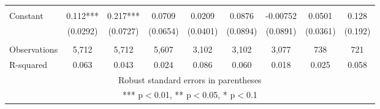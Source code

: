 \documentclass[]{article}
\begin{document}
\begin{tabular}{lcccccccc}
 &  &  &  &  &  &  &  &  \\
Constant & 0.112*** & 0.217*** & 0.0709 & 0.0209 & 0.0876 & -0.00752 & 0.0501 & 0.128 \\
 & (0.0292) & (0.0727) & (0.0654) & (0.0401) & (0.0894) & (0.0891) & (0.0361) & (0.192) \\
 &  &  &  &  &  &  &  &  \\
Observations & 5,712 & 5,712 & 5,607 & 3,102 & 3,102 & 3,077 & 738 & 721 \\
 R-squared & 0.063 & 0.043 & 0.024 & 0.086 & 0.060 & 0.018 & 0.025 & 0.058 \\ \hline
\multicolumn{9}{c}{ Robust standard errors in parentheses} \\
\multicolumn{9}{c}{ *** p$<$0.01, ** p$<$0.05, * p$<$0.1} \\
\end{tabular}
\end{document}
